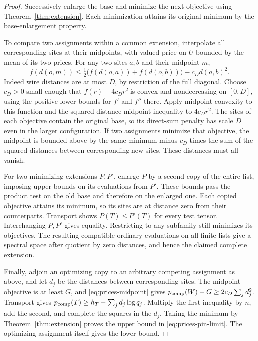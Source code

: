 \begin{proof}
Successively enlarge the base and minimize the next objective using
Theorem~\ref{thm:extension}. Each minimization attains its original
minimum by the base-enlargement property.

To compare two assignments within a common extension, interpolate all
corresponding sites at their midpoints, with valued price on \(U\)
bounded by the mean of its two prices. For any two sites \(a,b\) and
their midpoint \(m\),
\begin{equation}\label{eq:prices-midpoint}
 f(d(o,m))\le \tfrac12\bigl(f(d(o,a))+f(d(o,b))\bigr)
                  -c_Dd(a,b)^2 .
\end{equation}
Indeed wire distances are at most \(D\), by restriction of the full
diagonal. Choose \(c_D>0\) small enough that \(f(r)-4c_Dr^2\) is convex
and nondecreasing on \([0,D]\), using the positive lower bounds for
\(f'\) and \(f''\) there. Apply midpoint convexity to this function and
the squared-distance midpoint inequality to \(4c_Dr^2\).
The sites of each objective contain the original base, so its
direct-sum penalty has scale \(D\) even in the larger configuration.
If two assignments minimize that objective, the midpoint is bounded
above by the same minimum minus \(c_D\) times the sum of the squared
distances between corresponding new sites. These distances must all
vanish.

For two minimizing extensions \(P,P'\), enlarge \(P\) by a second copy
of the entire list, imposing upper bounds on its evaluations from \(P'\).
These bounds pass the product test on the old base and therefore on
the enlarged one. Each copied objective attains its minimum, so its sites
are at distance zero from their counterparts. Transport shows
\(P(T)\le P'(T)\) for every test tensor. Interchanging \(P,P'\) gives
equality. Restricting to any subfamily still minimizes its objectives.
The resulting compatible ordinary evaluations on all finite lists
give a spectral space after quotient by zero distances, and hence the
claimed complete extension.

Finally, adjoin an optimizing copy to an arbitrary competing assignment
as above, and let \(d_j\) be the distances between corresponding sites.
The midpoint objective is at least \(G\), and \eqref{eq:prices-midpoint}
gives \(p_{\rm comp}(W)-G\ge 2c_D\sum_jd_j^2\).
Transport gives \(p_{\rm comp}(T)\ge h_T-\sum_jd_j\log q_j\).
Multiply the first inequality by \(n\), add the second, and complete the
squares in the \(d_j\). Taking the minimum by
Theorem~\ref{thm:extension} proves the upper bound in
\eqref{eq:prices-pin-limit}. The optimizing assignment itself gives
the lower bound.
\end{proof}
